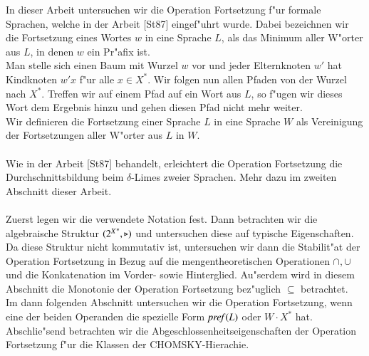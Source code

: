 In dieser Arbeit untersuchen wir die Operation Fortsetzung f"ur formale Sprachen, welche in der Arbeit [St87] eingef"uhrt wurde. Dabei bezeichnen wir die Fortsetzung eines Wortes $w$ in eine Sprache $L$, als das Minimum aller W"orter aus $L$, in denen $w$ ein Pr"afix ist. 
\\Man stelle sich einen Baum mit Wurzel $w$ vor und jeder Elternknoten $w'$ hat Kindknoten $w'x$ f"ur alle $x\in X^*$.
Wir folgen nun allen Pfaden von der Wurzel nach $X^*$. Treffen wir auf einem Pfad auf ein Wort aus $L$, so f"ugen wir dieses Wort dem Ergebnis hinzu und gehen diesen Pfad nicht mehr weiter.\\
Wir definieren die Fortsetzung einer Sprache $L$ in eine Sprache $W$ als Vereinigung der Fortsetzungen aller W"orter aus $L$ in $W$.\\\\
Wie in der Arbeit [St87] behandelt, erleichtert die Operation Fortsetzung die Durchschnittsbildung beim $\delta$-Limes zweier Sprachen. Mehr dazu im zweiten Abschnitt dieser Arbeit.\\\\
Zuerst legen wir die verwendete Notation fest. Dann betrachten wir die algebraische Struktur $({2^X}^*,\triangleright)$ und untersuchen diese auf typische Eigenschaften.
Da diese Struktur nicht kommutativ ist, untersuchen wir dann die Stabilit"at der Operation Fortsetzung in Bezug auf die mengentheoretischen Operationen $\cap,\cup$ und die Konkatenation im Vorder- sowie Hinterglied.
Au"serdem wird in diesem Abschnitt die Monotonie der Operation Fortsetzung bez"uglich $\subseteq$ betrachtet.
\\Im dann folgenden Abschnitt untersuchen wir die Operation Fortsetzung, wenn eine der beiden Operanden die spezielle Form $\mathit{pref{(}}L)$ oder $W\cdot X^*$ hat. Abschlie"send betrachten wir die Abgeschlossenheitseigenschaften der Operation Fortsetzung f"ur die Klassen der CHOMSKY-Hierachie.




